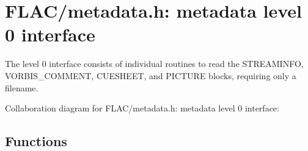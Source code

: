 \hypertarget{group__flac__metadata__level0}{}\section{F\+L\+A\+C/metadata.h\+: metadata level 0 interface}
\label{group__flac__metadata__level0}


The level 0 interface consists of individual routines to read the S\+T\+R\+E\+A\+M\+I\+N\+FO, V\+O\+R\+B\+I\+S\+\_\+\+C\+O\+M\+M\+E\+NT, C\+U\+E\+S\+H\+E\+ET, and P\+I\+C\+T\+U\+RE blocks, requiring only a filename.  


Collaboration diagram for F\+L\+A\+C/metadata.h\+: metadata level 0 interface\+:
\subsection*{Functions}
